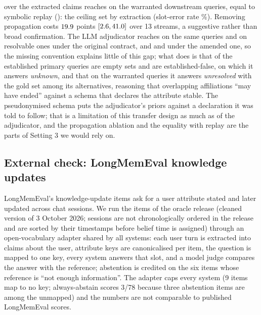 \pal{} over the extracted claims reaches \sThreePalWarr{} on the \sThreeWarrTotal{} warranted downstream queries, equal to symbolic replay (\sThreeRuleWarr): the ceiling set by extraction (slot-error rate \sThreeExtSlot\%). Removing propagation costs $19.9$ points $[2.6, 41.0]$ over 13 streams, a suggestive rather than broad confirmation. The LLM adjudicator reaches \sThreeLogWarr{} on the same queries and \sThreeLogRes{} on resolvable ones under the original contract, and \sThreeCtwoLogWarr{} and \sThreeCtwoLogRes{} under the amended one, so the missing convention explains little of this gap; what does is that \sThreeEstEmpty{} of the \sThreeEstTotal{} established primary queries are empty sets and \sThreeHoldsFalse{} are established-false, on which it answers \emph{unknown}, and that on the warranted queries it answers \emph{unresolved} with the gold set among its alternatives, reasoning that overlapping affiliations ``may have ended'' against a schema that declares the attribute stable. The pseudonymised schema puts the adjudicator's priors against a declaration it was told to follow; that is a limitation of this transfer design as much as of the adjudicator, and the propagation ablation and the equality with replay are the parts of Setting 3 we would rely on.

\subsection{External check: LongMemEval knowledge updates}\label{sec:res-lme}

LongMemEval's knowledge-update items \citep{longmemeval} ask for a user attribute stated and later updated across chat sessions. We run the \lmeN{} items of the oracle release (cleaned version of 3 October 2026; sessions are not chronologically ordered in the release and are sorted by their timestamps before belief time is assigned) through an open-vocabulary adapter shared by all systems: each user turn is extracted into claims about the user, attribute keys are canonicalised per item, the question is mapped to one key, every system answers that slot, and a model judge compares the answer with the reference; abstention is credited on the six items whose reference is ``not enough information''. The adapter caps every system (9 items map to no key; always-abstain scores 3/78 because three abstention items are among the unmapped) and the numbers are not comparable to published LongMemEval scores.

